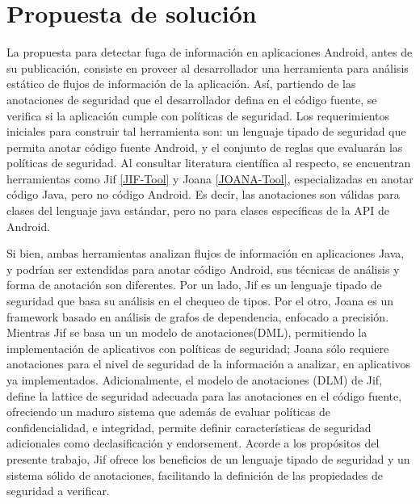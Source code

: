 \section{Propuesta de solución}
\label{sec:propuesta-sol} 
La propuesta para detectar fuga de información en aplicaciones Android, antes de
su publicación, consiste en proveer al desarrollador una herramienta para
análisis estático de flujos de información de la aplicación. Así, partiendo de
las anotaciones de seguridad que el desarrollador defina en el código fuente, se
verifica si la aplicación cumple con políticas de seguridad.\newline
Los requerimientos iniciales para construir tal herramienta son: un lenguaje
tipado de seguridad que permita anotar código fuente Android, y el conjunto de
reglas que evaluarán las políticas de seguridad.\newline 
Al consultar literatura científica al respecto, se encuentran herramientas como
Jif \ref{JIF-Tool} y Joana \ref{JOANA-Tool}, especializadas en anotar código
Java, pero no código Android. Es decir, las anotaciones son válidas para clases
del lenguaje java estándar, pero no para clases específicas de la API de Android.

Si bien, ambas herramientas analizan flujos de información en aplicaciones Java,
y podrían ser extendidas para anotar código Android, sus técnicas de análisis y
forma de anotación son diferentes.
Por un lado, Jif es un lenguaje tipado de seguridad que basa su análisis en el
chequeo de tipos.
Por el otro, Joana es un framework basado en análisis de grafos de
dependencia, enfocado a precisión.\newline
Mientras Jif se basa un un modelo de anotaciones(DML), permitiendo la
implementación de aplicativos con políticas de seguridad; Joana sólo requiere
anotaciones para el nivel de seguridad de la información a analizar, en
aplicativos ya implementados.\newline
Adicionalmente, el modelo de anotaciones (DLM) de Jif, define  la lattice de
seguridad adecuada para las anotaciones en el código fuente, ofreciendo un
maduro sistema que además de evaluar políticas de confidencialidad, e
integridad, permite definir características de seguridad adicionales como
declasificación y endorsement.\newline
Acorde a los propósitos del presente trabajo, Jif ofrece los beneficios de un
lenguaje tipado de seguridad y un sistema  sólido  de anotaciones, facilitando
la definición de las propiedades de seguridad a verificar. 

